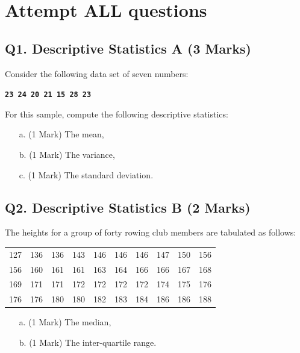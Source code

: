 \documentclass[a4paper,12pt]{article}
\begin{document}
\section*{Attempt ALL questions}

\subsection*{Q1. Descriptive Statistics A (3 Marks)} %
Consider the following data set of seven numbers:

\begin{center}
	\textbf{\texttt{23 24 20 21 15 28 23}}
\end{center}

\noindent For this sample, compute the following descriptive statistics:
\begin{itemize}
	\item[a.] (1 Mark) The mean,
	\item[b.] (1 Mark) The variance,
	\item[c.] (1 Mark) The standard deviation.
\end{itemize}

\subsection*{Q2. Descriptive Statistics B (2 Marks)} %
The heights for a group of forty rowing club members are tabulated as follows:

\begin{table}[ht]
	\begin{center}
		\begin{tabular}{|rrrrrrrrrr|}
			
			\hline
			127& 136& 136& 143& 146& 146& 146& 147& 150& 156\\
			156& 160& 161& 161& 163& 164& 166& 166& 167& 168\\
			169& 171& 171& 172& 172& 172& 172& 174& 175& 176\\
			176& 176& 180& 180& 182& 183& 184& 186& 186& 188\\
			\hline
		\end{tabular}
	\end{center}
\end{table}
\vspace{-0.5cm}
\begin{itemize}
	\item[a.] (1 Mark) The median,
	\item[b.] (1 Mark) The inter-quartile range.
\end{itemize}
\end{document}
